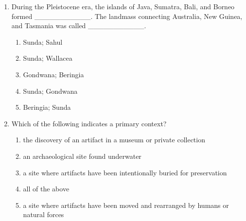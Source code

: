\documentclass[12pt]{article}
\begin{document}
\begin{enumerate}[label=\arabic*.]
\begin{enumerate}[label=(\alph*)]
    \item ritual human sacrifice
\end{enumerate}
\item During the Pleistocene era, the islands of Java, Sumatra, Bali, and Borneo formed \_\_\_\_\_\_\_\_\_\_\_. The landmass connecting Australia, New Guinea, and Tasmania was called \_\_\_\_\_\_\_\_\_\_\_.
\begin{enumerate}[label=(\alph*)]
    \item Sunda; Sahul
    \item Sunda; Wallacea
    \item Gondwana; Beringia
    \item Sunda; Gondwana
    \item Beringia; Sunda
\end{enumerate}
\item Which of the following indicates a primary context?
\begin{enumerate}[label=(\alph*)]
    \item the discovery of an artifact in a museum or private collection
    \item an archaeological site found underwater
    \item a site where artifacts have been intentionally buried for preservation
    \item all of the above
    \item a site where artifacts have been moved and rearranged by humans or natural forces
\end{enumerate}
\end{enumerate}
\end{document}
